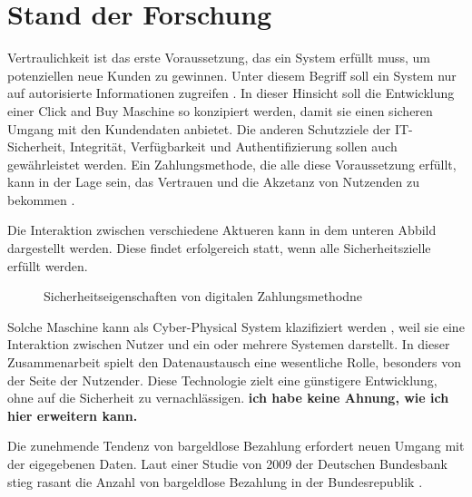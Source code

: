 \section{Stand der Forschung}

Vertraulichkeit ist das erste Voraussetzung, das ein System erfüllt muss, um potenziellen neue 
Kunden zu gewinnen. Unter diesem Begriff soll ein System nur auf autorisierte Informationen 
zugreifen \cite{refbook:SWIS}. In dieser Hinsicht soll die Entwicklung einer Click and Buy Maschine 
so konzipiert werden, damit sie einen sicheren Umgang mit den Kundendaten anbietet. Die anderen
Schutzziele der IT-Sicherheit, Integrität, Verfügbarkeit und Authentifizierung sollen auch gewährleistet
werden. Ein Zahlungsmethode, die alle diese Voraussetzung erfüllt, kann in der Lage sein, das Vertrauen
und die Akzetanz von Nutzenden zu bekommen \cite{refart:HARE}.

Die Interaktion zwischen verschiedene Aktueren kann in dem unteren Abbild dargestellt werden.
Diese findet erfolgereich statt, wenn alle Sicherheitszielle erfüllt werden.

\begin{figure}[htb]
    \caption{Sicherheitseigenschaften von digitalen Zahlungsmethodne}
    \label{fig:graphic}
\end{figure}

Solche Maschine kann als Cyber-Physical System klazifiziert werden \cite{inbook:MHNS}, weil sie 
eine Interaktion zwischen Nutzer und ein oder mehrere Systemen darstellt. In dieser Zusammenarbeit
spielt den Datenaustausch eine wesentliche Rolle, besonders von der Seite der Nutzender. 
Diese Technologie zielt eine günstigere Entwicklung, ohne auf die Sicherheit zu vernachlässigen.
\textbf{ich habe keine Ahnung, wie ich hier erweitern kann.}


Die zunehmende Tendenz von bargeldlose Bezahlung erfordert neuen Umgang mit der eigegebenen Daten.
Laut einer Studie von 2009 der Deutschen Bundesbank stieg rasant die Anzahl von bargeldlose Bezahlung 
in der Bundesrepublik \cite{refrep:DB}.

